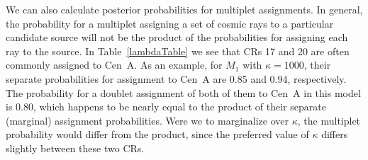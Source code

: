We can also calculate posterior probabilities for multiplet assignments.  In
general, the probability for a multiplet assigning a set of cosmic rays to a
particular candidate source will not be the product of the probabilities for
assigning each ray to the source.  In Table~\ref{lambdaTable} we see that
CRs 17 and 20 are often commonly assigned to Cen~A.  As an example, for
$M_1$ with $\kappa=1000$, their separate probabilities for assignment to
Cen~A are 0.85 and 0.94, respectively.  The probability for a doublet
assignment of both of them to Cen~A in this model is 0.80, which happens to
be nearly equal to the product of their separate (marginal) assignment
probabilities.  Were we to marginalize over $\kappa$, the multiplet
probability would differ from the product, since the preferred value
of $\kappa$ differs slightly between these two CRs.


